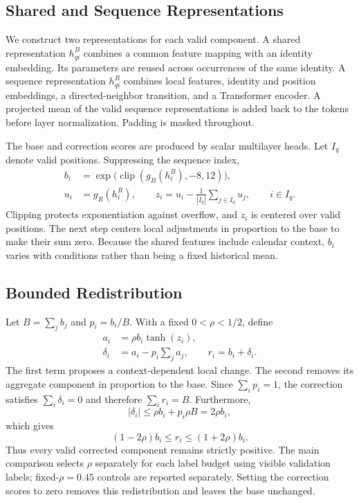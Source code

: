 \subsection{Shared and Sequence Representations}
We construct two representations for each valid component. A shared representation $h^B_{qi}$ combines a common feature mapping with an identity embedding. Its parameters are reused across occurrences of the same identity. A sequence representation $h^R_{qi}$ combines local features, identity and position embeddings, a directed-neighbor transition, and a Transformer encoder. A projected mean of the valid sequence representations is added back to the tokens before layer normalization. Padding is masked throughout.

The base and correction scores are produced by scalar multilayer heads. Let $I_q$ denote valid positions. Suppressing the sequence index,
\begin{align}
 b_i&=\exp\bigl(\operatorname{clip}(g_B(h^B_i),-8,12)\bigr),\\
 u_i&=g_R(h^R_i),\qquad
 z_i=u_i-\frac{1}{|I_q|}\sum_{j\in I_q}u_j,\qquad i\in I_q.
\label{eq:heads}
\end{align}
Clipping protects exponentiation against overflow, and $z_i$ is centered over valid positions. The next step centers local adjustments in proportion to the base to make their sum zero. Because the shared features include calendar context, $b_i$ varies with conditions rather than being a fixed historical mean.

\subsection{Bounded Redistribution}
Let $B=\sum_jb_j$ and $p_i=b_i/B$. With a fixed $0<\rho<1/2$, define
\begin{align}
 a_i&=\rho b_i\tanh(z_i),\\
 \delta_i&=a_i-p_i\sum_j a_j,\qquad r_i=b_i+\delta_i.
\label{eq:redistribution}
\end{align}
The first term proposes a context-dependent local change. The second removes its aggregate component in proportion to the base. Since $\sum_i p_i=1$, the correction satisfies $\sum_i\delta_i=0$ and therefore $\sum_ir_i=B$. Furthermore,
\begin{equation}
 |\delta_i|\leq\rho b_i+p_i\rho B=2\rho b_i,
\end{equation}
which gives
\begin{equation}
 (1-2\rho)b_i\leq r_i\leq(1+2\rho)b_i.
\label{eq:positive}
\end{equation}
Thus every valid corrected component remains strictly positive. The main comparison selects $\rho$ separately for each label budget using visible validation labels; fixed-$\rho=0.45$ controls are reported separately. Setting the correction scores to zero removes this redistribution and leaves the base unchanged.

